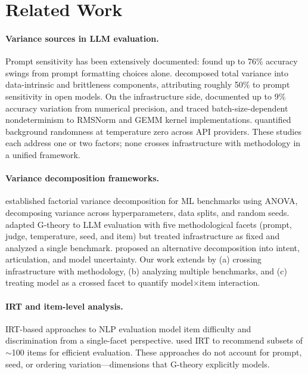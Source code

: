 \documentclass[11pt,letterpaper]{article}
\begin{document}
\section{Related Work}

\paragraph{Variance sources in LLM evaluation.}
Prompt sensitivity has been extensively documented: \citet{sclar2024quantifying} found up to 76\% accuracy swings from prompt formatting choices alone. \citet{brittlebench2026} decomposed total variance into data-intrinsic and brittleness components, attributing roughly 50\% to prompt sensitivity in open models. On the infrastructure side, \citet{yuan2025} documented up to 9\% accuracy variation from numerical precision, and \citet{thinkingmachines2025} traced batch-size-dependent nondeterminism to RMSNorm and GEMM kernel implementations. \citet{messina2026} quantified background randomness at temperature zero across API providers. These studies each address one or two factors; none crosses infrastructure with methodology in a unified framework.

\paragraph{Variance decomposition frameworks.}
\citet{bouthillier2021accounting} established factorial variance decomposition for ML benchmarks using ANOVA, decomposing variance across hyperparameters, data splits, and random seeds. \citet{mesting2026} adapted G-theory to LLM evaluation with five methodological facets (prompt, judge, temperature, seed, and item) but treated infrastructure as fixed and analyzed a single benchmark. \citet{kunievsky2025} proposed an alternative decomposition into intent, articulation, and model uncertainty. Our work extends \citet{mesting2026} by (a) crossing infrastructure with methodology, (b) analyzing multiple benchmarks, and (c) treating model as a crossed facet to quantify model$\times$item interaction.

\paragraph{IRT and item-level analysis.}
IRT-based approaches to NLP evaluation \citep{lalor2019learning,rodriguez2021evaluation,vania2021comparing} model item difficulty and discrimination from a single-facet perspective. \citet{polo2024tinybenchmarks} used IRT to recommend subsets of $\sim$100 items for efficient evaluation. These approaches do not account for prompt, seed, or ordering variation---dimensions that G-theory explicitly models.
\end{document}
